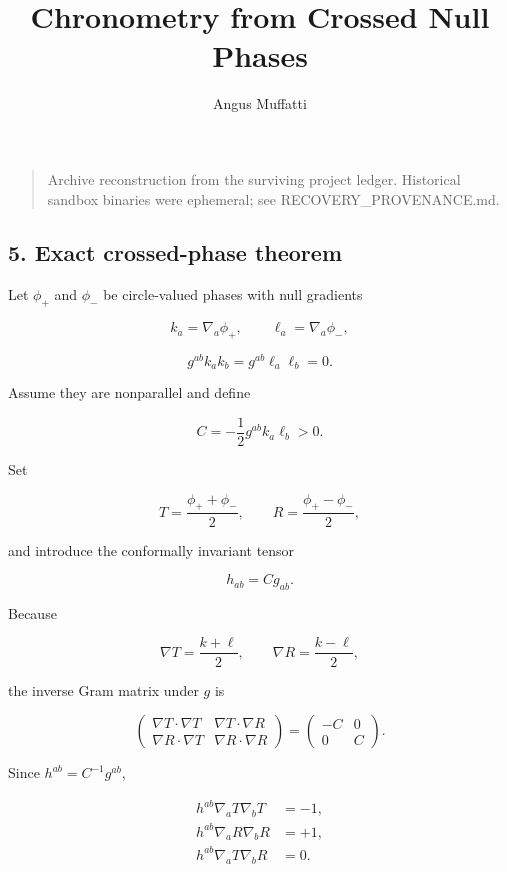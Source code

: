 \documentclass[
]{article}
\title{Chronometry from Crossed Null Phases}
\author{Angus Muffatti}
\date{}
\begin{document}
\maketitle

\begin{quote}
Archive reconstruction from the surviving project ledger. Historical
sandbox binaries were ephemeral; see RECOVERY\_PROVENANCE.md.
\end{quote}

\hypertarget{exact-crossed-phase-theorem}{%
\subsection{5. Exact crossed-phase
theorem}\label{exact-crossed-phase-theorem}}

Let \(\phi_+\) and \(\phi_-\) be circle-valued phases with null
gradients

\[
k_a=\nabla_a\phi_+,
\qquad
\ell_a=\nabla_a\phi_-,
\]

\[
g^{ab}k_ak_b=g^{ab}\ell_a\ell_b=0.
\]

Assume they are nonparallel and define

\[
C=-\frac12g^{ab}k_a\ell_b>0.
\]

Set

\[
T=\frac{\phi_++\phi_-}{2},
\qquad
R=\frac{\phi_+-\phi_-}{2},
\]

and introduce the conformally invariant tensor

\[
h_{ab}=C g_{ab}.
\]

Because

\[
\nabla T=\frac{k+\ell}{2},
\qquad
\nabla R=\frac{k-\ell}{2},
\]

the inverse Gram matrix under \(g\) is

\[
\begin{pmatrix}
\nabla T\cdot\nabla T & \nabla T\cdot\nabla R\\
\nabla R\cdot\nabla T & \nabla R\cdot\nabla R
\end{pmatrix}
=
\begin{pmatrix}
-C&0\\
0&C
\end{pmatrix}.
\]

Since \(h^{ab}=C^{-1}g^{ab}\),

\[
\boxed{
\begin{aligned}
h^{ab}\nabla_aT\nabla_bT&=-1,\\
h^{ab}\nabla_aR\nabla_bR&=+1,\\
h^{ab}\nabla_aT\nabla_bR&=0.
\end{aligned}}
\]
\end{document}
